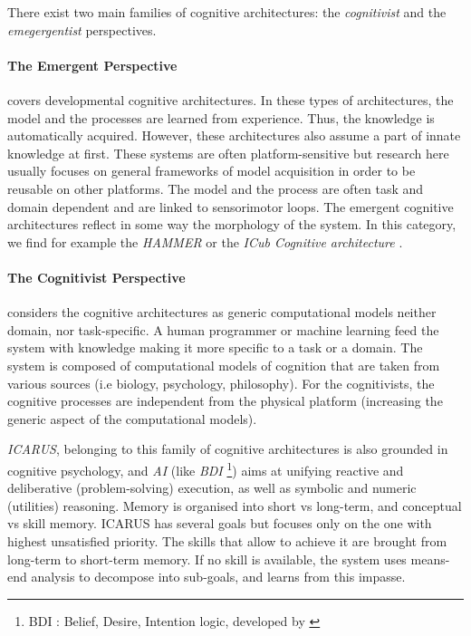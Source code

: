 \documentclass[conference]{IEEEtran}
\begin{document}
There exist two main families of cognitive architectures: the \textit{cognitivist} and the \textit{emegergentist} perspectives.

\paragraph{The Emergent Perspective} covers developmental cognitive architectures.
In these types of architectures, the model and the processes are learned from experience. 
Thus, the knowledge is automatically acquired. 
However, these architectures also assume a part of innate knowledge at first.
These systems are often platform-sensitive but research here usually focuses on general frameworks of model acquisition in order to be reusable on other platforms. 
The model and the process are often task and domain dependent and are linked to sensorimotor loops.
The emergent cognitive architectures reflect in some way the morphology of the system. 
In this category, we find for example the \textit{HAMMER} \cite{Demiris2005} or the \textit{ICub Cognitive architecture} \cite{Vernon2007}.


\paragraph{The Cognitivist Perspective} considers the cognitive architectures as generic computational models neither domain, nor task-specific. 
A human programmer or machine learning feed the system with knowledge making it more specific to a task or a domain.
The system is composed of computational models of cognition that are  taken from various sources (i.e biology, psychology, philosophy).
For the cognitivists, the cognitive processes are independent from the physical platform (increasing the generic aspect of the computational models).

\textit{ICARUS}, belonging to this family of cognitive architectures \cite{LaChRo2005,Langley2006} is also grounded in cognitive psychology, and \textit{AI} (like \textit{BDI} \footnote{BDI : Belief, Desire, Intention logic, developed by \cite{bratman1987}}) aims at unifying reactive and deliberative (problem-solving) execution, as well as symbolic and numeric (utilities) reasoning. 
Memory is organised into short vs long-term, and conceptual vs skill memory.
ICARUS has several goals but focuses only on the one with highest unsatisfied priority.
The skills that allow to achieve it are brought from long-term to short-term memory.
If no skill is available, the system uses means-end analysis to decompose into sub-goals, and learns from this impasse.
\end{document}
